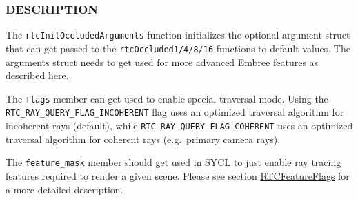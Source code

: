 \begin{Shaded}
\begin{Highlighting}[]

\OperatorTok{\{}
\OperatorTok{,}
\OperatorTok{,}
\OperatorTok{,}
\OperatorTok{\};}

\OperatorTok{\{}
  \OperatorTok{;}
  \OperatorTok{;}
  \OperatorTok{*}\OperatorTok{;}
\OperatorTok{;}
\OperatorTok{;}
  \OperatorTok{;}
\OperatorTok{\};}

\OperatorTok{(}
  \OperatorTok{*}
\OperatorTok{);}
\end{Highlighting}
\end{Shaded}

\subsubsection{DESCRIPTION}\label{description}

The \texttt{rtcInitOccludedArguments} function initializes the optional
argument struct that can get passed to the \texttt{rtcOccluded1/4/8/16}
functions to default values. The arguments struct needs to get used for
more advanced Embree features as described here.

The \texttt{flags} member can get used to enable special traversal mode.
Using the \texttt{RTC\_RAY\_QUERY\_FLAG\_INCOHERENT} flag uses an
optimized traversal algorithm for incoherent rays (default), while
\texttt{RTC\_RAY\_QUERY\_FLAG\_COHERENT} uses an optimized traversal
algorithm for coherent rays (e.g.~primary camera rays).

The \texttt{feature\_mask} member should get used in SYCL to just enable
ray tracing features required to render a given scene. Please see
section \hyperref[rtcfeatureflags]{RTCFeatureFlags} for a more detailed
description.

